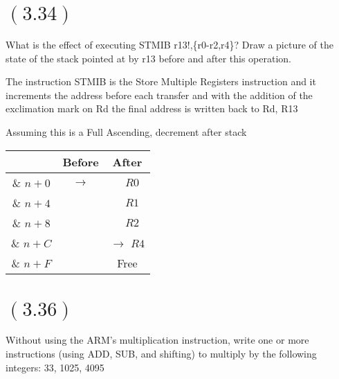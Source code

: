 \documentclass[letterpaper,12pt,titlepage]{article}
\begin{document}
\section*{$(3.34)$} What is the effect of executing STMIB r13!,\{r0-r2,r4\}? Draw a picture of the state of the stack pointed at by r13 before and after this operation.
\begin{mdframed}[style=MyFrame]

The instruction STMIB is the Store Multiple Registers instruction and it increments the address before each transfer and with the addition of the exclimation mark on Rd the final address is written back to Rd, R13 \\

\begin{center}
Assuming this is a Full Ascending, decrement after stack
\begin{tabular}{| c | c | c |}
\hline
& Before & After\\ \hline \hline
\& $n+0$ &  $\rightarrow$ &$~~~~R0$\\ \hline
\& $n+4$ &   &$~~~~R1$\\ \hline
\& $n+8$ &   &$~~~~R2$\\ \hline
\& $n+C$ &   &$\rightarrow$ $R4$\\ \hline
\& $n+F$ &   &Free\\ \hline

\end{tabular}
\end{center}
\end{mdframed}

\section*{$(3.36)$} Without using the ARM's multiplication instruction, write one or more instructions (using ADD, SUB, and shifting) to multiply by the following integers: 33, 1025, 4095
\end{document}
